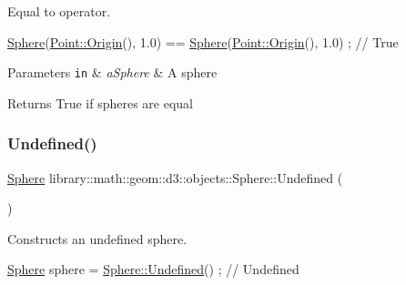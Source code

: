 Equal to operator. 


\begin{DoxyCode}
\hyperlink{classlibrary_1_1math_1_1geom_1_1d3_1_1objects_1_1_sphere_a55dccc8ea16ee55cd7694c26afa8ea39}{Sphere}(\hyperlink{classlibrary_1_1math_1_1geom_1_1d3_1_1objects_1_1_point_ab2a38e285c562e50bf350272c083986f}{Point::Origin}(), 1.0) == \hyperlink{classlibrary_1_1math_1_1geom_1_1d3_1_1objects_1_1_sphere_a55dccc8ea16ee55cd7694c26afa8ea39}{Sphere}(\hyperlink{classlibrary_1_1math_1_1geom_1_1d3_1_1objects_1_1_point_ab2a38e285c562e50bf350272c083986f}{Point::Origin}(), 1.0) ; \textcolor{comment}{//
       True}
\end{DoxyCode}



\begin{DoxyParams}[1]{Parameters}
\mbox{\tt in}  & {\em a\+Sphere} & A sphere \\
\hline
\end{DoxyParams}
\begin{DoxyReturn}{Returns}
True if spheres are equal 
\end{DoxyReturn}
\mbox{\label{classlibrary_1_1math_1_1geom_1_1d3_1_1objects_1_1_sphere_a777600f8814a2879e925909f30cfe9c4}} 
\subsubsection{\texorpdfstring{Undefined()}{Undefined()}}
{\footnotesize\ttfamily \hyperlink{classlibrary_1_1math_1_1geom_1_1d3_1_1objects_1_1_sphere}{Sphere} library\+::math\+::geom\+::d3\+::objects\+::\+Sphere\+::\+Undefined (\begin{DoxyParamCaption}{ }\end{DoxyParamCaption})\hspace{0.3cm}{\ttfamily [static]}}



Constructs an undefined sphere. 


\begin{DoxyCode}
\hyperlink{classlibrary_1_1math_1_1geom_1_1d3_1_1objects_1_1_sphere_a55dccc8ea16ee55cd7694c26afa8ea39}{Sphere} sphere = \hyperlink{classlibrary_1_1math_1_1geom_1_1d3_1_1objects_1_1_sphere_a777600f8814a2879e925909f30cfe9c4}{Sphere::Undefined}() ; \textcolor{comment}{// Undefined}
\end{DoxyCode}


